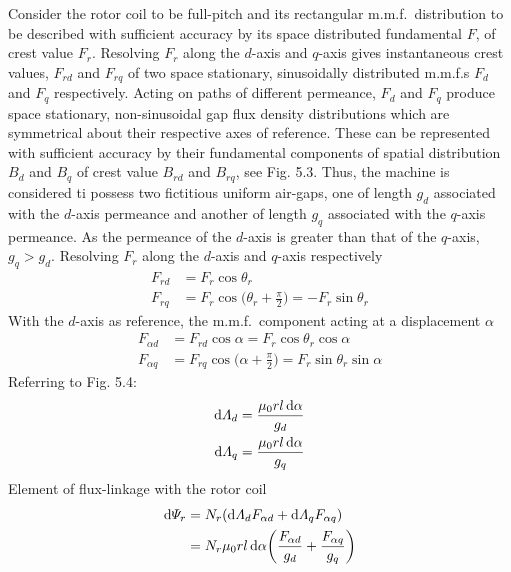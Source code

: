 \documentclass[a4paper,numbers=noenddot,12pt]{scrbook}
\begin{document}
Consider the rotor coil to be full-pitch and its rectangular m.m.f.\ distribution to be described with sufficient accuracy by its space distributed fundamental $F$, of crest value $F_r$. Resolving $F_r$ along the $d$-axis and $q$-axis gives instantaneous crest values, $F_{rd}$ and $F_{rq}$ of two space stationary, sinusoidally distributed m.m.f.s $F_d$ and $F_q$ respectively. Acting on paths of different permeance, $F_d$ and $F_q$ produce space stationary, non-sinusoidal gap flux density distributions which are symmetrical about their respective axes of reference. These can be represented with sufficient accuracy by their fundamental components of spatial distribution $B_d$ and $B_q$ of crest value $B_{rd}$ and $B_{rq}$, see Fig. 5.3. Thus, the machine is considered ti possess two fictitious uniform air-gaps, one of length $g_d$ associated with the $d$-axis permeance and another of length $g_q$ associated with the $q$-axis permeance. As the permeance of the $d$-axis is greater than that of the $q$-axis, $g_q>g_d$. Resolving $F_r$ along the $d$-axis and $q$-axis respectively
\begin{equation}
    \begin{aligned}
        F_{rd} & = F_r \cos \theta_r \\
        F_{rq} & = F_r \cos\bigg( \theta_r+\frac{\pi}{2} \bigg)= -F_r \sin \theta_r
    \end{aligned}
\end{equation}
With the $d$-axis as reference, the m.m.f.\ component acting at a displacement $\alpha$
\begin{equation}
    \begin{aligned}
        F_{\alpha d} & = F_{r d} \cos \alpha = F_r  \cos \theta_r \cos \alpha \\
        F_{\alpha q} & = F_{r q} \cos\bigg( \alpha + \frac{\pi}{2} \bigg)= F_r \sin \theta_r \sin \alpha 
    \end{aligned}
\end{equation}
Referring to Fig. 5.4:
\begin{equation}
    \begin{aligned}
        \dif \varLambda_d & = \frac{\mu_0 r l \dif \alpha}{g_d}  \\
        \dif \varLambda_q & = \frac{\mu_0 r l \dif \alpha}{g_q} 
    \end{aligned}
\end{equation}
Element of flux-linkage with the rotor coil
\begin{equation}
    \begin{aligned}
        \dif \varPsi_r & = N_r (\dif \varLambda_d F_{\alpha d} + \dif \varLambda_q F_{\alpha q}) \\
        & = N_r \mu_0 r l \dif \alpha \bigg(\frac{F_{\alpha d}}{g_d} + \frac{F_{\alpha q}}{g_q} \bigg) 
    \end{aligned}
\end{equation}
\end{document}
